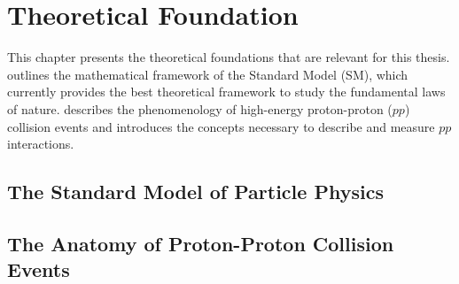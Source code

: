 \chapter{Theoretical Foundation}
\label{chap:theory}

This chapter presents the theoretical foundations that are relevant for this thesis.  
 outlines the mathematical framework of the Standard Model (SM), which currently provides the best theoretical framework to study the fundamental laws of nature. 
 describes the phenomenology of high-energy proton-proton ($pp$) collision events and introduces the concepts necessary to describe and measure $pp$ interactions. 



\section{The Standard Model of Particle Physics}
\label{sec:sm}


\section{The Anatomy of Proton-Proton Collision Events}
\label{sec:anatomy}




